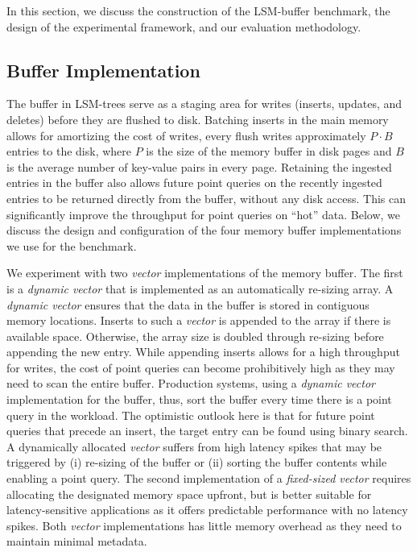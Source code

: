 In this section, we discuss the construction of the LSM-buffer benchmark, the design of the experimental framework, and our evaluation methodology. 



\subsection{Buffer Implementation}
The buffer in LSM-trees serve as a staging area for writes (inserts, updates, and deletes) before they are flushed to disk. 
Batching inserts in the main memory allows for amortizing the cost of writes, every flush writes approximately $P\cdot B$ entries to the disk, where $P$ is the size of the memory buffer in disk pages and $B$ is the average number of key-value pairs in every page. 
Retaining the ingested entries in the buffer also allows future point queries on the recently ingested entries to be returned directly from the buffer, without any disk access. 
This can significantly improve the throughput for point queries on ``hot'' data. 
Below, we discuss the design and configuration of the four memory buffer implementations we use for the benchmark.

We experiment with two \textit{vector} implementations of the memory buffer. 
The first is a \textit{dynamic vector} that is implemented as an automatically re-sizing array. 
A \textit{dynamic vector} ensures that the data in the buffer is stored in contiguous memory locations. 
Inserts to such a \textit{vector} is appended to the array if there is available space. 
Otherwise, the array size is doubled through re-sizing before appending the new entry. 
While appending inserts allows for a high throughput for writes, the cost of point queries can become prohibitively high as they may need to scan the entire buffer. 
Production systems, using a \textit{dynamic vector} implementation for the buffer, thus, sort the buffer every time there is a point query in the workload. 
The optimistic outlook here is that for future point queries that precede an insert, the target entry can be found using binary search. 
A dynamically allocated \textit{vector} suffers from high latency spikes that may be triggered by (i) re-sizing of the buffer or (ii) sorting the buffer contents while enabling a point query. 
The second implementation of a \textit{fixed-sized vector} requires allocating the designated memory space upfront, but is better suitable for latency-sensitive applications as it offers predictable performance with no latency spikes. 
Both \textit{vector} implementations has little memory overhead as they need to maintain minimal metadata. 

